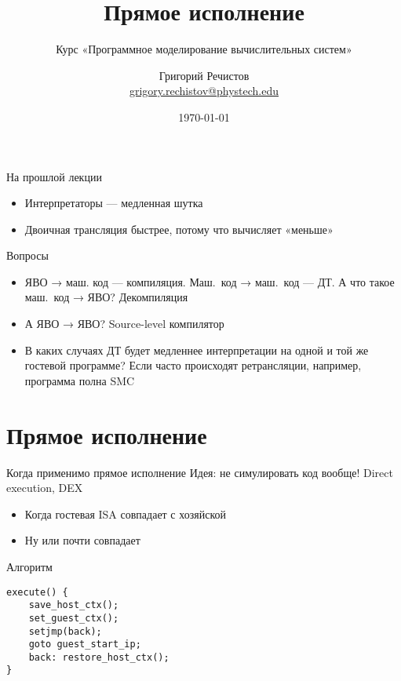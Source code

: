 \documentclass{beamer}
\title{Прямое исполнение}
\subtitle{Курс «Программное моделирование вычислительных систем»}
\author[]{Григорий Речистов \\ \small{\href{mailto:grigory.rechistov@phystech.edu}{grigory.rechistov@phystech.edu}}}
\date{\today}
\begin{document}
\begin{frame}
    \maketitle
\end{frame}

\begin{frame}
    \tableofcontents
\end{frame}


\begin{frame}{На прошлой лекции}
\begin{itemize}
\item Интерпретаторы — медленная шутка
\item Двоичная трансляция быстрее, потому что вычисляет «меньше»
\end{itemize}
\end{frame}

\begin{frame}{Вопросы}
\begin{itemize}
\item ЯВО → маш. код — компиляция. Маш.~код → маш.~код — ДТ. А что такое маш.~код → ЯВО?\pause{} Декомпиляция\pause
\item А ЯВО → ЯВО?\pause{} Source-level компилятор\pause
\item В каких случаях ДТ будет медленнее интерпретации на одной и той же гостевой программе? \pause Если часто происходят ретрансляции, например, программа полна SMC
\end{itemize}

\end{frame}


\section{Прямое исполнение}

\begin{frame}{Когда применимо прямое исполнение}
Идея: не симулировать код вообще! Direct execution, DEX
\begin{itemize}
\item Когда гостевая ISA совпадает с хозяйской
\item Ну или почти совпадает
\end{itemize}

\end{frame}

\begin{frame}[fragile]{Алгоритм}
\begin{verbatim}
execute() {
    save_host_ctx();
    set_guest_ctx();
    setjmp(back);
    goto guest_start_ip;
    back: restore_host_ctx();
}
\end{verbatim}
\end{frame}
\end{document}
